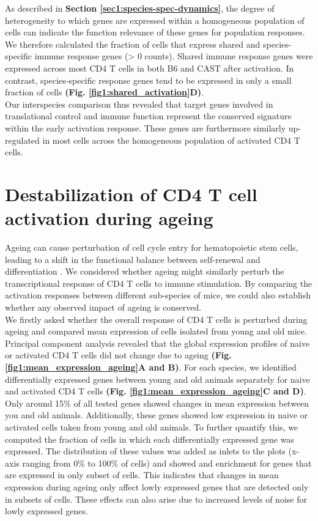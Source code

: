 As described in \textbf{Section \ref{sec1:species-spec-dynamics}}, the degree of heterogeneity to which genes are expressed within a homogeneous population of cells can indicate the function relevance of these genes for population responses. We therefore calculated the fraction of cells that express shared and species-specific immune response genes (> 0 counts). Shared immune response genes were expressed across most CD4\plus{} T cells in both B6 and CAST after activation. In contrast, species-specific response genes tend to be expressed in only a small fraction of cells \textbf{(Fig. \ref{fig1:shared_activation}D)}. \\

Our interspecies comparison thus revealed that target genes involved in translational control and immune function represent the conserved signature within the early activation response. These genes are furthermore similarly up-regulated in most cells across the homogeneous population of activated CD4\plus{} T cells. 

\newpage

\section{Destabilization of CD4\plus{} T cell activation during ageing}

Ageing can cause perturbation of cell cycle entry for hematopoietic stem cells, leading to a shift in the functional balance between self-renewal and differentiation \citep{Kowalczyk2015}. We considered whether ageing might similarly perturb the transcriptional response of CD4\plus{} T cells to immune stimulation. By comparing the activation responses between different sub-species of mice, we could also establish whether any observed impact of ageing is conserved.\\

We firstly asked whether the overall response of CD4\plus{} T cells is perturbed during ageing and compared mean expression of cells isolated from young and old mice. Principal component analysis revealed that the global expression profiles of naive or activated CD4\plus{} T cells did not change due to ageing \textbf{(Fig. \ref{fig1:mean_expression_ageing}A and B)}. For each species, we identified differentially expressed genes between young and old animals separately for naive and activated CD4\plus{} T cells \textbf{(Fig. \ref{fig1:mean_expression_ageing}C and D)}. Only around 15\% of all tested genes showed changes in mean expression between you and old animals. Additionally, these genes showed low expression in naive or activated cells taken from young and old animals. To further quantify this, we computed the fraction of cells in which each differentially expressed gene was expressed. The distribution of these values was added as inlets to the plots (x-axis ranging from 0\% to 100\% of cells) and showed and enrichment for genes that are expressed in only subset of cells. This indicates that changes in mean expression during ageing only affect lowly expressed genes that are detected only in subsets of cells. These effects can also arise due to increased levels of noise for lowly expressed genes. \\

